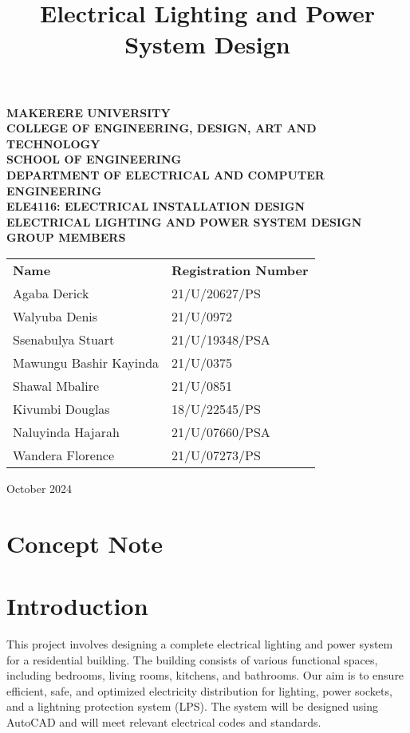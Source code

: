 \documentclass[a4paper,12pt]{article}
\title{\Huge \textbf{Electrical Lighting and Power System Design}}
\author{}
\date{}
\begin{document}
\begin{titlepage}
    \centering
    \vspace*{0.5in}
    \Huge \textbf{MAKERERE UNIVERSITY}\\[0.5cm]
    \Large \textbf{COLLEGE OF ENGINEERING, DESIGN, ART AND TECHNOLOGY}\\[0.5cm]
    \Large \textbf{SCHOOL OF ENGINEERING}\\[0.5cm]
    \Large \textbf{DEPARTMENT OF ELECTRICAL AND COMPUTER ENGINEERING}\\[1cm]
    \Large \textbf{ELE4116: ELECTRICAL INSTALLATION DESIGN}\\[1cm]
    \Huge \textbf{ELECTRICAL LIGHTING AND POWER SYSTEM DESIGN}\\[1.5cm]

    \Large \textbf{GROUP MEMBERS}\\[0.5cm]

    \begin{tabular}{ll}
        \textbf{Name} & \textbf{Registration Number} \\
        Agaba Derick & 21/U/20627/PS \\
        Walyuba Denis & 21/U/0972 \\
        Ssenabulya Stuart & 21/U/19348/PSA \\
        Mawungu Bashir Kayinda & 21/U/0375 \\
        Shawal Mbalire & 21/U/0851 \\
        Kivumbi Douglas & 18/U/22545/PS \\
        Naluyinda Hajarah & 21/U/07660/PSA \\
        Wandera Florence & 21/U/07273/PS \\
    \end{tabular}

    \vfill
    \Large October 2024
\end{titlepage}

\newpage

\section*{Concept Note}

\section{Introduction}
This project involves designing a complete electrical lighting and power system for a residential building. The building consists of various functional spaces, including bedrooms, living rooms, kitchens, and bathrooms. Our aim is to ensure efficient, safe, and optimized electricity distribution for lighting, power sockets, and a lightning protection system (LPS). The system will be designed using AutoCAD and will meet relevant electrical codes and standards.
\end{document}
